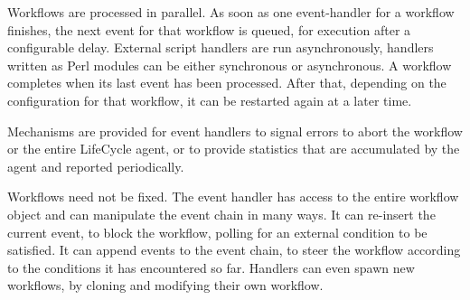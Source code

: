 Workflows are processed in parallel. As soon as one event-handler for a workflow finishes, the next event for that workflow is queued, for execution after a configurable delay. External script handlers are run asynchronously, handlers written as Perl modules can be either synchronous or asynchronous. A workflow completes when its last event has been processed. After that, depending on the configuration for that workflow, it can be restarted again at a later time.

Mechanisms are provided for event handlers to signal errors to abort the workflow or the entire LifeCycle agent, or to provide statistics that are accumulated by the agent and reported periodically.

Workflows need not be fixed. The event handler has access to the entire workflow object and can manipulate the event chain in many ways. It can re-insert the current event, to block the workflow, polling for an external condition to be satisfied. It can append events to the event chain, to steer the workflow according to the conditions it has encountered so far. Handlers can even spawn new workflows, by cloning and modifying their own workflow.